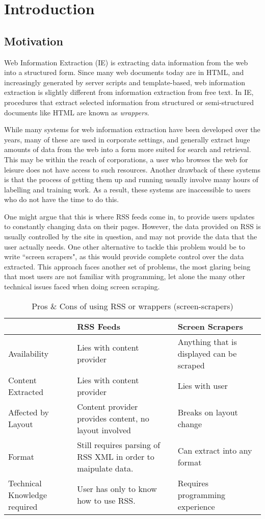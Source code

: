 \chapter{Introduction}

\section{Motivation}
Web Information Extraction (IE) is extracting data information from the web into a structured form.
Since many web documents today are in HTML, and increasingly generated by server scripts and
template-based, web information extraction is slightly different from information extraction
from free text. In IE, procedures that extract selected information from structured or semi-structured
documents like HTML are known as \textit{wrappers}.

While many systems for web information extraction have been developed over the years, many of
these are used in corporate settings, and generally extract huge amounts of data from the web
into a form more suited for search and retrieval. This may be within the reach of
corporations, a user who browses the web for leisure does not have access to such resources.
Another drawback of these systems is that the process of getting them up and running usually
involve many hours of labelling and training work. As a result, these systems are inaccessible
to users who do not have the time to do this.

One might argue that this is where RSS feeds come in, to provide users updates to constantly
changing data on their pages. However, the data provided on RSS is usually controlled by the
site in question, and may not provide the data that the user actually needs. One other
alternative to tackle this problem would be to write ``screen scrapers", as this would provide
complete control over the data extracted. This approach faces another set of problems, the most
glaring being that most users are not familiar with programming, let alone the many other
technical issues faced when doing screen scraping.


\begin{table}[t]
\centering
\singlespacing
\small
\begin{tabular}{|p{3cm}|p{5cm}|p{5cm}|}
\hline
					&	RSS Feeds	&	Screen Scrapers \\
\hline
\hline
	Availability	&
	Lies with content provider &
	Anything that is displayed can be scraped \\
\hline
	Content Extracted &
	Lies with content provider &
	Lies with user \\
\hline
	Affected by Layout &
	Content provider provides content, no layout involved &
	Breaks on layout change \\
\hline
	Format &
	Still requires parsing of RSS XML in order to maipulate data. &
	Can extract into any format \\
\hline
	Technical Knowledge required &
	User has only to know how to use RSS. &
	Requires programming experience \\
	\hline
\end{tabular}
\caption{Pros \& Cons of using RSS or wrappers (screen-scrapers)}
\label{tab:template}
\end{table}


